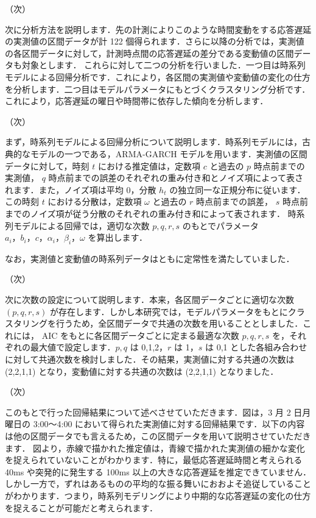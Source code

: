 \documentclass[a4j]{jarticle}
\begin{document}
（次）

次に分析方法を説明します．先の計測によりこのような時間変動をする応答遅延の実測値の区間データが計 122 個得られます．さらに以降の分析では，実測値の各区間データに対して，計測時点間の応答遅延の差分である変動値の区間データも対象とします．
これらに対して二つの分析を行いました．一つ目は時系列モデルによる回帰分析です．これにより，各区間の実測値や変動値の変化の仕方を分析します．二つ目はモデルパラメータにもとづくクラスタリング分析です．これにより，応答遅延の曜日や時間帯に依存した傾向を分析します．

（次）

まず，時系列モデルによる回帰分析について説明します．時系列モデルには，古典的なモデルの一つである，ARMA-GARCH モデルを用います．実測値の区間データに対して，時刻 $t$ における推定値は，定数項 $c$ と過去の $p$ 時点前までの実測値， $q$  時点前までの誤差のそれぞれの重み付き和とノイズ項によって表されます．また，ノイズ項は平均 0，分散 $h_t$ の独立同一な正規分布に従います．この時刻 $t$ における分散は，定数項 $\omega$ と過去の $r$ 時点前までの誤差， $s$ 時点前までのノイズ項が従う分散のそれぞれの重み付き和によって表されます．
時系列モデルによる回帰では，適切な次数 $p,q,r,s$ のもとでパラメータ $a_i，b_i，c，\alpha_i，\beta_i，\omega$ を算出します．

なお，実測値と変動値の時系列データはともに定常性を満たしていました．

（次）

次に次数の設定について説明します．本来，各区間データごとに適切な次数 $(p,q,r,s)$ が存在します．しかし本研究では，モデルパラメータをもとにクラスタリングを行うため，全区間データで共通の次数を用いることとしました．これには， AIC をもとに各区間データごとに定まる最適な次数 $p,q,r,s$ を，それぞれの最大値で設定します．$p,q$ は 0,1,2，$r$ は 1，$s$ は 0,1 とした各組み合わせに対して共通次数を検討しました．その結果，実測値に対する共通の次数は (2,2,1,1) となり，変動値に対する共通の次数は (2,2,1,1) となりました．

（次）

このもとで行った回帰結果について述べさせていただきます．図は，3 月 2 日月曜日の 3:00～4:00 において得られた実測値に対する回帰結果です．以下の内容は他の区間データでも言えるため，この区間データを用いて説明させていただきます．
図より，赤線で描かれた推定値は，青線で描かれた実測値の細かな変化を捉えられていないことがわかります．特に，最低応答遅延時間と考えられる 40ms や突発的に発生する 100ms 以上の大きな応答遅延を推定できていません．しかし一方で，ずれはあるものの平均的な振る舞いにおおよそ追従していることがわかります．つまり，時系列モデリングにより中期的な応答遅延の変化の仕方を捉えることが可能だと考えられます．
\end{document}

